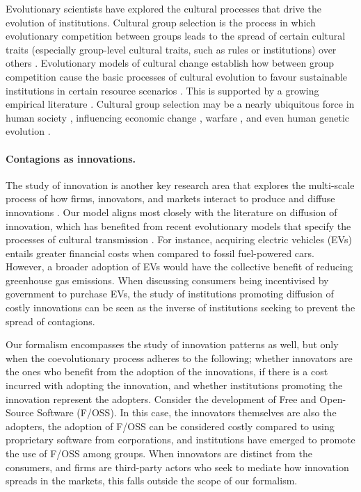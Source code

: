 Evolutionary scientists have explored the cultural processes that drive the evolution of institutions. Cultural group selection \cite{henrich_cultural_2004, van_den_bergh_group_2009} is the process in which evolutionary competition between groups leads to the spread of certain cultural traits (especially group-level cultural traits, such as rules or institutions) over others \cite{currie_12_2016}. Evolutionary models of cultural change establish how between group competition cause the basic processes of cultural evolution to favour sustainable institutions in certain resource scenarios \cite{waring_coevolution_2017, andrews_cultural_2024}. This is supported by a growing empirical literature \cite{waring_evidence_2018, andrews_cultural_2018}. Cultural group selection may be a nearly ubiquitous force in human society \cite{richerson_cultural_2016}, influencing economic change \cite{francois_origins_2018, guler_global_2002}, warfare \cite{zefferman_evolutionary_2015}, and even  human genetic evolution \cite{waring_long-term_2021, andersson_toward_2019}.


\paragraph*{Contagions as innovations.} 

The study of innovation is another key research area that explores the multi-scale process of how firms, innovators, and markets interact to produce and diffuse innovations \cite{schumpeter_theory_1934, metcalfe_evolutionary_1998, fagerberg_innovation_2006}. Our model aligns most closely with the literature on diffusion of innovation, which has benefited from recent evolutionary models that specify the processes of cultural transmission \cite{tverskoi_spread_2022}. For instance, acquiring electric vehicles (EVs) entails greater financial costs when compared to fossil fuel-powered cars. However, a broader adoption of EVs would have the collective benefit of reducing greenhouse gas emissions. When discussing consumers being incentivised by government to purchase EVs, the study of institutions promoting diffusion of costly innovations can be seen as the inverse of institutions seeking to prevent the spread of contagions.

Our formalism encompasses the study of innovation patterns as well, but only when the coevolutionary process adheres to the following; whether innovators are the ones who benefit from the adoption of the innovations, if there is a cost incurred with adopting the innovation, and whether institutions promoting the innovation represent the adopters. Consider the development of Free and Open-Source Software (F/OSS). In this case, the innovators themselves are also the adopters, the adoption of F/OSS can be considered costly compared to using proprietary software from corporations, and institutions have emerged to promote the use of F/OSS among groups. When innovators are distinct from the consumers, and firms are third-party actors who seek to mediate how innovation spreads in the markets, this falls outside the scope of our formalism.

